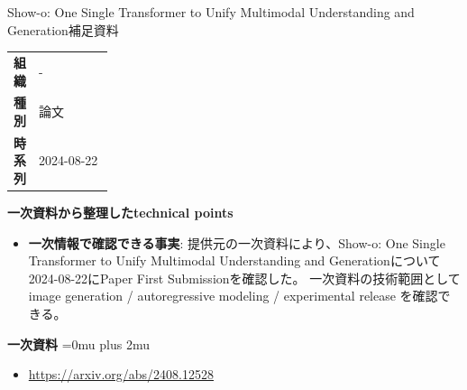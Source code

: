 \begin{technicalnote}{Show-o: One Single Transformer to Unify Multimodal Understanding and Generation}{補足資料}
\begingroup
\begin{tabularx}{\linewidth}{@{}>{\bfseries}p{0.22\linewidth}X@{}}
組織 & - \\
種別 & 論文 \\
時系列 & 2024-08-22 \\
\end{tabularx}
\smallskip
{\bfseries 一次資料から整理したtechnical points}
\begin{itemize}[leftmargin=1.5em,itemsep=0.35em]
\item \textbf{一次情報で確認できる事実}: 提供元の一次資料により、Show-o: One Single Transformer to Unify Multimodal Understanding and Generationについて2024-08-22にPaper First Submissionを確認した。 一次資料の技術範囲として image generation / autoregressive modeling / experimental release を確認できる。
\end{itemize}
\begin{minipage}{\linewidth}
\begin{samepage}
{\bfseries 一次資料}
\begingroup\sloppy
\Urlmuskip=0mu plus 2mu\relax
\begin{itemize}[leftmargin=1.5em,itemsep=0.25em]
\item {\scriptsize\url{https://arxiv.org/abs/2408.12528}}
\end{itemize}
\endgroup
\end{samepage}
\end{minipage}
\endgroup
\end{technicalnote}
\medskip

